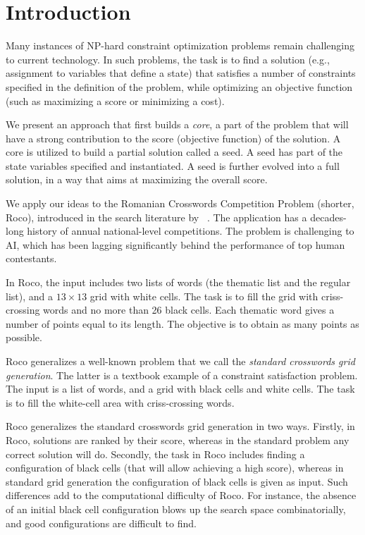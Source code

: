 \section{Introduction}
\label{sec::intro}

Many instances of NP-hard constraint optimization problems
remain challenging to current technology.
In such problems, the task is to find a solution
(e.g., assignment to variables that define a state) 
that satisfies a number of constraints specified in the definition
of the problem, while optimizing an objective function
(such as maximizing a score or minimizing a cost).


We present an approach that first builds a \emph{core},
a part of the problem that will have a strong contribution
to the score (objective function) of the solution.
A core is utilized to build a partial solution called a seed.
A seed has part of the state variables specified and instantiated.
A seed is further evolved into a full solution, in a way that aims
at maximizing the overall score.

We apply our ideas to the Romanian Crosswords Competition Problem (shorter, {\sc Roco}),
introduced in the search literature by
\citeauthor{DBLP:conf/socs/BoteaB21}~.
The application has a decades-long history of annual national-level competitions.
The problem is challenging to AI, which has been lagging significantly
behind the performance of top human contestants.

In {\sc Roco}, the input includes two lists of words (the thematic list and the regular list),
and a $13 \times 13$ grid with white cells.
The task is to fill the grid with criss-crossing words and no more than 26 black cells.
Each thematic word gives a number of points equal to its length. The objective
is to obtain as many points as possible.

{\sc Roco} generalizes a well-known problem that we
call the \emph{standard crosswords grid generation}.
The latter is a textbook example of a constraint satisfaction problem.
The input is a list of words, and a grid with black cells and white cells.
The task is to fill the white-cell area with criss-crossing words.

{\sc Roco} generalizes the standard crosswords grid generation in two ways.
Firstly, in {\sc Roco}, solutions are ranked by their score,
whereas in the standard problem any correct solution will do.
Secondly, the task in {\sc Roco} includes finding a configuration of black cells
(that will allow achieving a high score), whereas in standard grid
generation the configuration of black cells is given as input.
Such differences add to the computational difficulty of {\sc Roco}.
For instance, the absence of an initial black cell configuration
blows up the search space combinatorially, and good configurations are difficult to find.

